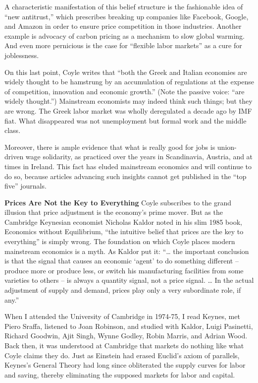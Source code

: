 \documentclass[
]{book}
\begin{document}
A characteristic manifestation of this belief structure is the fashionable idea of ``new antitrust,'' which prescribes breaking up companies like Facebook, Google, and Amazon in order to ensure price competition in those industries. Another example is advocacy of carbon pricing as a mechanism to slow global warming. And even more pernicious is the case for ``flexible labor markets'' as a cure for joblessness.

On this last point, Coyle writes that ``both the Greek and Italian economies are widely thought to be hamstrung by an accumulation of regulations at the expense of competition, innovation and economic growth.'' (Note the passive voice: ``are widely thought.'') Mainstream economists may indeed think such things; but they are wrong. The Greek labor market was wholly deregulated a decade ago by IMF fiat. What disappeared was not unemployment but formal work and the middle class.

Moreover, there is ample evidence that what is really good for jobs is union-driven wage solidarity, as practiced over the years in Scandinavia, Austria, and at times in Ireland. This fact has eluded mainstream economics and will continue to do so, because articles advancing such insights cannot get published in the ``top five'' journals.

\textbf{Prices Are Not the Key to Everything}
Coyle subscribes to the grand illusion that price adjustment is the economy's prime mover. But as the Cambridge Keynesian economist Nicholas Kaldor noted in his slim 1985 book, Economics without Equilibrium, ``the intuitive belief that prices are the key to everything'' is simply wrong. The foundation on which Coyle places modern mainstream economics is a myth. As Kaldor put it: ``\ldots{} the important conclusion is that the signal that causes an economic `agent' to do something different -- produce more or produce less, or switch his manufacturing facilities from some varieties to others -- is always a quantity signal, not a price signal. \ldots{} In the actual adjustment of supply and demand, prices play only a very subordinate role, if any.''

When I attended the University of Cambridge in 1974-75, I read Keynes, met Piero Sraffa, listened to Joan Robinson, and studied with Kaldor, Luigi Pasinetti, Richard Goodwin, Ajit Singh, Wynne Godley, Robin Marris, and Adrian Wood. Back then, it was understood at Cambridge that markets do nothing like what Coyle claims they do. Just as Einstein had erased Euclid's axiom of parallels, Keynes's General Theory had long since obliterated the supply curves for labor and saving, thereby eliminating the supposed markets for labor and capital.
\end{document}
